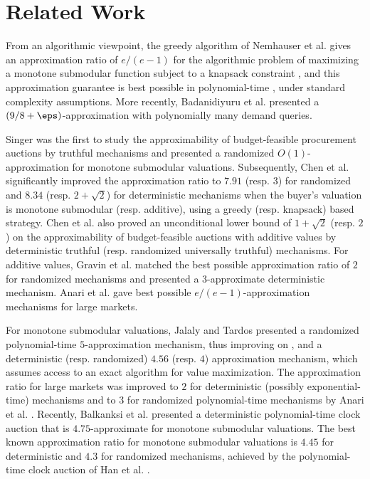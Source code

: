 \section{Related Work}
\label{sec:related}

From an algorithmic viewpoint, the greedy algorithm of Nemhauser et al. \cite{NemhauserWF78} gives an approximation ratio of $e/(e-1)$ for the algorithmic problem of maximizing a monotone submodular function subject to a knapsack constraint \cite{Sviri04}, and this approximation guarantee is best possible in polynomial-time  \cite{KhullerMN99}, under standard complexity assumptions. More recently, Badanidiyuru et al. \cite{BadaDO19} presented a $(9/8+\eps)$-approximation with  polynomially many demand queries.

Singer \cite{Singer10,Singer13} was the first to study the approximability of budget-feasible procurement auctions by truthful mechanisms and presented a randomized $O(1)$-approximation for monotone submodular valuations. Subsequently, Chen et al. \cite{ChenGL2011} significantly improved the approximation ratio to $7.91$ (resp. $3$) for randomized and $8.34$ (resp. $2+\sqrt{2}$) for deterministic mechanisms when the buyer's valuation is monotone submodular (resp. additive), using a greedy (resp. knapsack) based strategy. Chen et al. also proved an unconditional lower bound of $1+\sqrt{2}$ (resp. $2$) on the approximability of budget-feasible auctions with additive values by deterministic truthful (resp. randomized universally truthful) mechanisms. For additive values, Gravin et al. \cite{GravinJLZ2020} matched the best possible approximation ratio of $2$ for randomized mechanisms and presented a $3$-approximate deterministic mechanism. Anari et al. \cite{AnariGN2014} gave best possible $e/(e-1)$-approximation mechanisms for large markets. 

For monotone submodular valuations, Jalaly and Tardos \cite{JalalyT2021} presented a randomized polynomial-time $5$-approximation mechanism, thus improving on \cite{ChenGL2011}, 
and a deterministic (resp. randomized) $4.56$ (resp. $4$) approximation mechanism, which assumes access to an exact algorithm for value maximization.
The approximation ratio for large markets was improved to $2$ for deterministic (possibly exponential-time) mechanisms and to $3$ for randomized polynomial-time mechanisms by Anari et al. \cite{AnariGN2014}. Recently, Balkanksi et al. \cite{BalkanskiGGST2022} presented a deterministic polynomial-time clock auction that is $4.75$-approximate for monotone submodular valuations. The best known approximation ratio for monotone submodular valuations is $4.45$ for deterministic and $4.3$ for randomized mechanisms, achieved by the polynomial-time clock auction of Han et al. \cite{HanWHC23}. %

